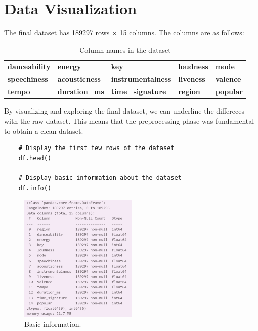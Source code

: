 \chapter{Data Visualization}

The final dataset has 189297 rows × 15 columns. The columns are as follows: 
\begin{table}[h!]
    \centering
    \begin{tabular}{lllll} %
    \toprule
    \textbf{danceability} & \textbf{energy} & \textbf{key} & \textbf{loudness} & \textbf{mode} \\
    \textbf{speechiness} & \textbf{acousticness} & \textbf{instrumentalness} & \textbf{liveness} & \textbf{valence} \\
    \textbf{tempo} & \textbf{duration\_ms} & \textbf{time\_signature} & \textbf{region} & \textbf{popular} \\
    \bottomrule
    \end{tabular}
    \caption{Column names in the dataset}
\end{table}

By visualizing and exploring the final dataset, we can underline the differeces with the raw dataset. This means that the preprocessing phase was fundamental to obtain a clean dataset.

\begin{verbatim}
    # Display the first few rows of the dataset
    df.head()
    
    # Display basic information about the dataset
    df.info()
    \end{verbatim}
    
    \begin{figure}[h]
        \centering
        \includegraphics[width=0.5\textwidth]{media/info_cleaned.png} 
        \caption{Basic information.}
        \label{df.info()}
    \end{figure}

